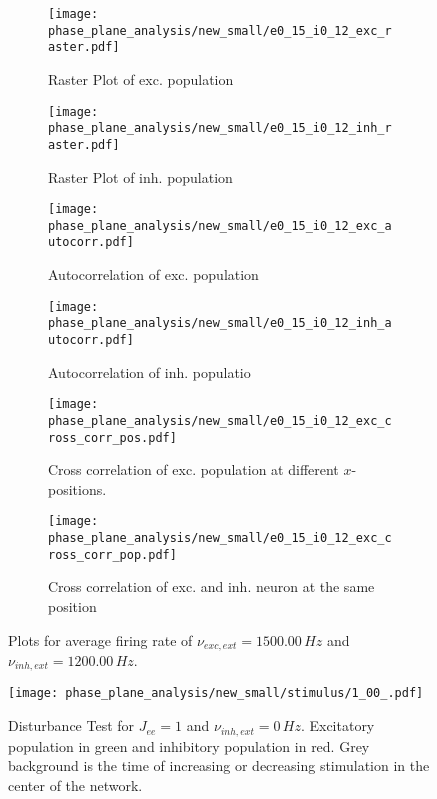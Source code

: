 \documentclass[a4paper,12pt]{article}
\begin{document}
\begin{figure}
    \begin{subfigure}[b]{0.49\textwidth}
        \texttt{[image: phase\_plane\_analysis/new\_small/e0\_15\_i0\_12\_exc\_raster.pdf]}
        \caption{Raster Plot of exc. population}
    \end{subfigure}
    \begin{subfigure}[b]{0.49\textwidth}
        \texttt{[image: phase\_plane\_analysis/new\_small/e0\_15\_i0\_12\_inh\_raster.pdf]}
        \caption{Raster Plot of inh. population}
    \end{subfigure}
    \begin{subfigure}[b]{0.49\textwidth}
        \texttt{[image: phase\_plane\_analysis/new\_small/e0\_15\_i0\_12\_exc\_autocorr.pdf]}
        \caption{Autocorrelation of exc. population}
    \end{subfigure}
    \begin{subfigure}[b]{0.49\textwidth}
        \texttt{[image: phase\_plane\_analysis/new\_small/e0\_15\_i0\_12\_inh\_autocorr.pdf]}
        \caption{Autocorrelation of inh. populatio}
    \end{subfigure}
    \begin{subfigure}[b]{0.49\textwidth}
        \texttt{[image: phase\_plane\_analysis/new\_small/e0\_15\_i0\_12\_exc\_cross\_corr\_pos.pdf]}
        \caption{Cross correlation of exc. population at different $x$-positions.}
    \end{subfigure}
    \begin{subfigure}[b]{0.49\textwidth}
        \texttt{[image: phase\_plane\_analysis/new\_small/e0\_15\_i0\_12\_exc\_cross\_corr\_pop.pdf]}
        \caption{Cross correlation of exc. and inh. neuron at the same position}
    \end{subfigure}
    \caption{Plots for average firing rate of 
                $\nu_{exc,ext} = 1500.00 \,\si{Hz}$ and $\nu_{inh,ext} = 1200.00 \,\si{Hz}$.
                }
\end{figure}
    \clearpage
    \begin{figure}
    \centering
        \texttt{[image: phase\_plane\_analysis/new\_small/stimulus/1\_00\_.pdf]}
        \caption{
            Disturbance Test for $J_{ee} = 1$ and $\nu_{inh,ext} = 0 \,\si{Hz}$.
            Excitatory population in green and inhibitory population in red. 
            Grey background is the time of increasing or decreasing stimulation 
            in the center of the network.
            }
    \end{figure}
    
\end{document}
